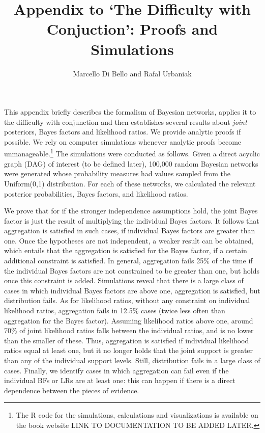 \documentclass[
  10pt,
  dvipsnames,enabledeprecatedfontcommands]{scrartcl}
\title{Appendix to `The Difficulty with Conjuction': Proofs and
Simulations}
\author{Marcello Di Bello and Rafal Urbaniak}
\date{}
\newcommand{\mar}[1]{\todo[color=blue!40]{#1}}
\begin{document}
\maketitle

This appendix briefly describes the formalism of Bayesian networks,
applies it to the difficulty with conjunction and then establishes
several results about \textit{joint} posteriors, Bayes factors and
likelihood ratios. We provide analytic proofs if possible. We rely on
computer simulations whenever analytic proofs become
unmanageable.\footnote{The R code for the simulations, calculations and
  visualizations is available on the book website LINK TO DOCUMENTATION
  TO BE ADDED LATER.} The simulations were conducted as follows. Given a
direct acyclic graph (DAG) of interest (to be defined later), 100,000
random Bayesian networks were generated whose probability measures had
values sampled from the \textsf{Uniform(0,1)} distribution. For each of
these networks, we calculated the relevant posterior probabilities,
Bayes factors, and likelihood ratios.

\mar{added short summary here}

We prove that for if the stronger independence assumptions hold, the
joint Bayes factor is just the result of multiplying the individual
Bayes factors. It follows that aggregation is satisfied in such cases,
if individual Bayes factors are greater than one. Once the hypotheses
are not independent, a weaker result can be obtained, which entails that
the aggregation is satisfied for the Bayes factor, if a certain
additional constraint is satisfied. In general, aggregation fails 25\%
of the time if the individual Bayes factors are not constrained to be
greater than one, but holds once this constraint is added. Simulations
reveal that there is a large class of cases in which individual Bayes
factors are above one, aggregation is satisfied, but distribution fails.
As for likelihood ratios, without any constraint on individual
likelihood ratios, aggregation fails in 12.5\% cases (twice less often
than aggregation for the Bayes factor). Assuming likelihood ratios above
one, around 70\% of joint likelihood ratios falls between the individual
ratios, and is no lower than the smaller of these. Thus, aggregation is
satisfied if individual likelihood ratios equal at least one, but it no
longer holds that the joint support is greater than any of the
individual support levels. Still, distribution fails in a large class of
cases. Finally, we identify cases in which aggregation can fail even if
the individual BFs or LRs are at least one: this can happen if there is
a direct dependence between the pieces of evidence.
\end{document}
